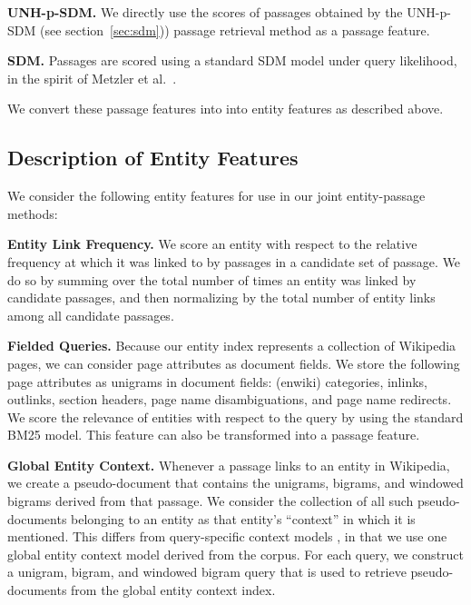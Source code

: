 \documentclass{article}
\begin{document}
\textbf{UNH-p-SDM.} We directly use the scores of passages obtained by the UNH-p-SDM (see section~\ref{sec:sdm})) passage retrieval method as a passage feature. 

\textbf{SDM.} Passages are scored using a standard SDM model under query likelihood, in the spirit of Metzler et al.\ \cite{metzler2005markov}.

We convert these passage features into into entity features as described above.


\subsection{Description of Entity Features}\label{sec:jointentity}
We consider the following entity features for use in our joint entity-passage methods:


\textbf{Entity Link Frequency. } We score an entity with respect to the relative frequency at which it was linked to by passages in a candidate set of passage. We do so by summing over the total number of times an entity was linked by candidate passages, and then normalizing by the total number of entity links among all candidate passages. %


\textbf{Fielded Queries.} Because our entity index represents a collection of Wikipedia pages, we can consider page attributes as document fields. We store the following page attributes as unigrams in document fields: (enwiki) categories, inlinks, outlinks, section headers, page name disambiguations, and page name redirects. We score the relevance of entities with respect to the query by using the standard BM25 model.  This feature can also be transformed into a passage feature.


\textbf{Global Entity Context.} Whenever a passage links to an entity in Wikipedia, we create a pseudo-document that contains the unigrams, bigrams, and windowed bigrams derived from that passage.  We consider the collection of all such pseudo-documents belonging to an entity as that entity's ``context'' in which it is mentioned. This differs from query-specific context models  \cite{dalton2014entity}, in that we use one global entity context model derived from the corpus. For each query, we construct a unigram, bigram, and windowed bigram query that is used to retrieve pseudo-documents from the global entity context index. 
\end{document}
